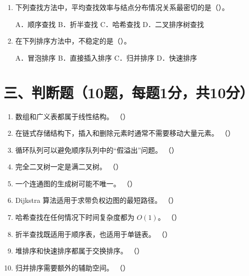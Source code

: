 \documentclass{../../note}
\begin{document}
\begin{enumerate}[itemsep=0.8em]
A．不便于判断两顶点是否相邻
\quad B．不便于进行 DFS
\quad C．浪费存储空间
\quad D．无法表示带权图

\item 下列查找方法中，平均查找效率与结点分布情况关系最密切的是（\hspace{0.8cm}）。

A．顺序查找 \quad B．折半查找 \quad C．哈希查找 \quad D．二叉排序树查找

\item 在下列排序方法中，不稳定的是（\hspace{0.8cm}）。

A．冒泡排序 \quad B．直接插入排序 \quad C．归并排序 \quad D．快速排序
\end{enumerate}

\section*{三、判断题（10题，每题1分，共10分）}

\begin{enumerate}[itemsep=0.6em]
\item 数组和广义表都属于线性结构。 （\hspace{0.8cm}）
\item 在链式存储结构下，插入和删除元素时通常不需要移动大量元素。 （\hspace{0.8cm}）
\item 循环队列可以避免顺序队列中的“假溢出”问题。 （\hspace{0.8cm}）
\item 完全二叉树一定是满二叉树。 （\hspace{0.8cm}）
\item 一个连通图的生成树可能不唯一。 （\hspace{0.8cm}）
\item Dijkstra 算法适用于求带负权边图的最短路径。 （\hspace{0.8cm}）
\item 哈希查找在任何情况下时间复杂度都为 $O(1)$。 （\hspace{0.8cm}）
\item 折半查找既适用于顺序表，也适用于单链表。 （\hspace{0.8cm}）
\item 堆排序和快速排序都属于交换排序。 （\hspace{0.8cm}）
\item 归并排序需要额外的辅助空间。 （\hspace{0.8cm}）
\end{enumerate}
\end{document}

